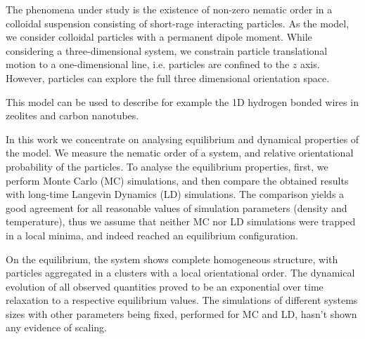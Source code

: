 \documentclass[12pt, a4paper]{article}
\author{Maksym Polovyi}
\begin{document}
The phenomena under study is the existence of non-zero nematic order in a colloidal suspension consisting of short-rage interacting particles. As the model, we consider colloidal particles with a permanent dipole moment. While considering a three-dimensional system, we constrain particle translational motion to a one-dimensional line, i.e. particles are confined to the $z$ axis. However, particles can explore the full three dimensional orientation space.

This model can be used to describe for example the 1D hydrogen bonded wires in zeolites and carbon nanotubes.

In this work we concentrate on analysing equilibrium and dynamical properties of the model. We measure the nematic order of a system, and relative orientational  probability of the particles. To analyse the equilibrium properties, first, we perform Monte Carlo (MC) simulations, and then compare the obtained results with long-time Langevin Dynamics (LD) simulations. The comparison yields a good agreement for all reasonable values of simulation parameters (density and temperature), thus we assume that neither MC nor LD simulations were trapped in a local minima, and indeed reached an equilibrium configuration.

On the equilibrium, the system shows complete homogeneous structure, with particles aggregated in a clusters with a local orientational order. The dynamical evolution of all observed quantities proved to be an exponential over time relaxation to a respective equilibrium values.
The simulations of different systems sizes with other parameters being fixed, performed for MC and LD, hasn't shown any evidence of scaling.
\end{document}
